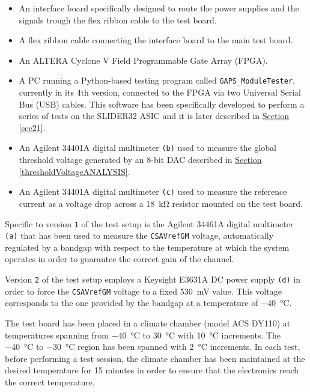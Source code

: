 \begin{itemize}
    \item An interface board specifically designed to route the power supplies and the signals trough the flex ribbon cable to the test board.
    \item A flex ribbon cable connecting the interface board to the main test board.
    \item An ALTERA Cyclone V Field Programmable Gate Array (FPGA).
    \item A PC running a Python-based testing program called \texttt{GAPS\_ModuleTester}, currently in its 4th version, connected to the FPGA via two Universal Serial Bus (USB) cables. This software has been specifically developed to perform a series of tests on the SLIDER32 ASIC and it is later described in \hyperref[sec21]{Section \ref{sec21}}.
    \item An Agilent 34401A digital multimeter \texttt{(b)} used to measure the global threshold voltage generated by an 8-bit DAC described in \hyperref[thresholdVoltageANALYSIS]{Section \ref{thresholdVoltageANALYSIS}}.
    \item An Agilent 34401A digital multimeter \texttt{(c)} used to measure the reference current as a voltage drop across a \SI{18}{\kilo\ohm} resistor mounted on the test board.
\end{itemize}

\par
Specific to version \texttt{1} of the test setup is the Agilent 34461A digital multimeter \texttt{(a)} that has been used to measure the \texttt{CSAVrefGM} voltage, automatically regulated by a bandgap with respect to the temperature at which the system operates in order to guarantee the correct gain of the channel.

\par
Version \texttt{2} of the test setup employs a Keysight E3631A DC power supply \texttt{(d)} in order to force the \texttt{CSAVrefGM} voltage to a fixed \SI{530}{\milli\volt} value. This voltage corresponds to the one provided by the bandgap at a temperature of \SI{-40}{\celsius}.

\par
The test board has been placed in a climate chamber (model ACS DY110) at temperatures spanning from \SI{-40}{\celsius} to \SI{30}{\celsius} with \SI{10}{\celsius} increments. The \SI{-40}{\celsius} to \SI{-30}{\celsius} region has been spanned with \SI{2}{\celsius} increments. In each test, before performing a test session, the climate chamber has been maintained at the desired temperature for 15 minutes in order to ensure that the electronics reach the correct temperature.

